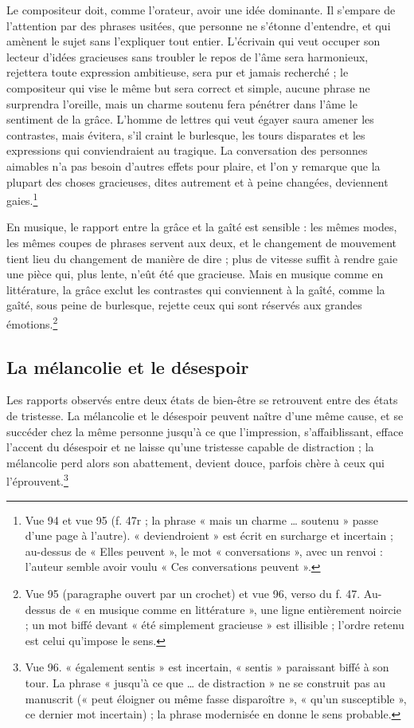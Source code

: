 \documentclass[11pt,a4paper]{article}
\begin{document}
Le compositeur doit, comme l'orateur, avoir une idée dominante. Il s'empare de
l'attention par des phrases usitées, que personne ne s'étonne d'entendre, et qui
amènent le sujet sans l'expliquer tout entier. L'écrivain qui veut occuper son
lecteur d'idées gracieuses sans troubler le repos de l'âme sera harmonieux,
rejettera toute expression ambitieuse, sera pur et jamais recherché ; le
compositeur qui vise le même but sera correct et simple, aucune phrase ne
surprendra l'oreille, mais un charme soutenu fera pénétrer dans l'âme le
sentiment de la grâce. L'homme de lettres qui veut égayer saura amener les
contrastes, mais évitera, s'il craint le burlesque, les tours disparates et les
expressions qui conviendraient au tragique. La conversation des personnes
aimables n'a pas besoin d'autres effets pour plaire, et l'on y remarque que la
plupart des choses gracieuses, dites autrement et à peine changées, deviennent
gaies.\footnote{Vue 94 et vue 95 (f. 47r ; la phrase « mais un charme \ldots{}
soutenu » passe d'une page à l'autre). « deviendroient » est écrit en surcharge
et incertain ; au-dessus de « Elles peuvent », le mot « conversations », avec un
renvoi : l'auteur semble avoir voulu « Ces conversations peuvent ».}

En musique, le rapport entre la grâce et la gaîté est sensible : les mêmes modes,
les mêmes coupes de phrases servent aux deux, et le changement de mouvement tient
lieu du changement de manière de dire ; plus de vitesse suffit à rendre gaie une
pièce qui, plus lente, n'eût été que gracieuse. Mais en musique comme en
littérature, la grâce exclut les contrastes qui conviennent à la gaîté, comme la
gaîté, sous peine de burlesque, rejette ceux qui sont réservés aux grandes
émotions.\footnote{Vue 95 (paragraphe ouvert par un crochet) et vue 96, verso du
f. 47. Au-dessus de « en musique comme en littérature », une ligne entièrement
noircie ; un mot biffé devant « été simplement gracieuse » est illisible ; l'ordre
retenu est celui qu'impose le sens.}

\subsection*{La mélancolie et le désespoir}

Les rapports observés entre deux états de bien-être se retrouvent entre des états
de tristesse. La mélancolie et le désespoir peuvent naître d'une même cause, et se
succéder chez la même personne jusqu'à ce que l'impression, s'affaiblissant,
efface l'accent du désespoir et ne laisse qu'une tristesse capable de distraction ;
la mélancolie perd alors son abattement, devient douce, parfois chère à ceux qui
l'éprouvent.\footnote{Vue 96. « également sentis » est incertain, « sentis »
paraissant biffé à son tour. La phrase « jusqu'à ce que \ldots{} de distraction »
ne se construit pas au manuscrit (« peut éloigner ou même fasse disparoître »,
« qu'un susceptible », ce dernier mot incertain) ; la phrase modernisée en donne
le sens probable.}
\end{document}

